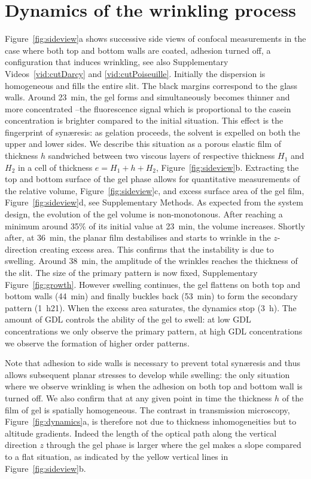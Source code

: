 \documentclass[twocolumn,superscriptaddress,showpacs,preprintnumbers,
amsmath,amssymb,prl]{revtex4-1}
\begin{document}
\section*{Dynamics of the wrinkling process}

Figure~\ref{fig:sideview}a shows successive side views of confocal measurements in the case where both top and bottom walls are coated, adhesion turned off, a configuration that induces wrinkling, see also Supplementary Videos~\ref{vid:cutDarcy} and \ref{vid:cutPoiseuille}. Initially the dispersion is homogeneous and fills the entire slit. The black margins correspond to the glass walls. Around \SI{23}{\minute}, the gel forms and simultaneously becomes thinner and more concentrated --the fluorescence signal which is proportional to the casein concentration is brighter compared to the initial situation. This effect is the fingerprint of syn\ae{}resis: as gelation proceeds, the solvent is expelled on both the upper and lower sides. We describe this situation as a porous elastic film of thickness $h$ sandwiched between two viscous layers of respective thickness $H_1$ and $H_2$ in a cell of thickness $e=H_1+h+H_2$,  Figure~\ref{fig:sideview}b. Extracting the top and bottom surface of the gel phase allows for quantitative measurements of the relative volume, Figure~\ref{fig:sideview}c, and excess surface area of the gel film, Figure~\ref{fig:sideview}d, see Supplementary Methods. As expected from the system design, the evolution of the gel volume is non-monotonous. After reaching a minimum around 35\% of its initial value at \SI{23}{\minute}, the volume increases. Shortly after,  at \SI{36}{\minute}, the planar film destabilises and starts to wrinkle in the $z$-direction creating excess area. This confirms that the instability is due to swelling. Around \SI{38}{\minute}, the amplitude of the wrinkles reaches the thickness of the slit. The size of the primary pattern is now fixed, Supplementary Figure~\ref{fig:growth}. However swelling continues, the gel flattens on both top and bottom walls (\SI{44}{\minute}) and finally buckles back (\SI{53}{\minute}) to form the secondary pattern (\SI{1}{\hour}21). When the excess area saturates, the dynamics stop (\SI{3}{\hour}). The amount of GDL controls the ability of the gel to swell: at low GDL concentrations we only observe the primary pattern, at high GDL concentrations we observe the formation of higher order patterns. 

Note that adhesion to side walls is necessary to prevent total syn\ae{}resis and thus allows subsequent planar stresses to develop while swelling: the only situation where we observe wrinkling is when the adhesion on both top and bottom wall is turned off. We also confirm that at any given point in time the thickness $h$ of the film of gel is spatially homogeneous. The contrast in transmission microscopy, Figure~\ref{fig:dynamics}a, is therefore not due to thickness inhomogeneities but to altitude gradients. Indeed the length of the optical path along the vertical direction $z$ through the gel phase is larger where the gel makes a slope compared to a flat situation, as indicated by the yellow vertical lines in Figure~\ref{fig:sideview}b.
\end{document}
